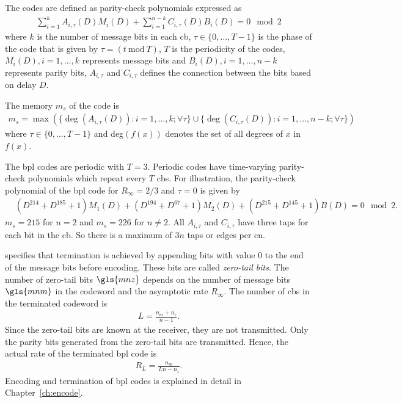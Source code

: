 The codes are defined as parity-check polynomials expressed as
\begin{align}
\sum_{i=1}^{k}A_{i,\tau}(D)M_i(D)+\sum_{i=1}^{n-k}C_{i,\tau}(D)B_i(D)=0\mod 2
\end{align}
where $k$ is the number of message bits in each \gls{cb}, $\tau \in \{0,\dots,T-1\}$ is the phase of the code that is given by $\tau=(t\ \text{mod}\ T)$, $T$ is the periodicity of the codes, $M_i(D),i=1,\dots,k$ represents message bits and $B_i(D),i=1,\dots,n-k$ represents parity bits, $A_{i,\tau}$ and $C_{i,\tau}$ defines the connection between the bits based on delay $D$.

The memory $m_s$ of the code is
\begin{align}
m_s=\max\left(\{\deg(A_{i,\tau}(D)):i=1,\dots,k;\forall\tau\}\cup\{\deg(C_{i,\tau}(D)):i=1,\dots,n-k;\forall\tau\}\right)
\end{align}
where $\tau \in \{0,\dots,T-1\}$ and deg$(f(x))$ denotes the set of all degrees of $x$ in $f(x)$.

The \gls{bpl} codes are periodic with $T=3$. Periodic codes have time-varying parity-check polynomials which repeat every $T$ \glspl{cb}. For illustration, the parity-check polynomial of the \gls{bpl} code for $R_\infty=2/3$ and $\tau=0$ is given by
\begin{align}
&(D^{214}+D^{185}+1)M_1(D)+(D^{194}+D^{67}+1)M_2(D)+(D^{215}+D^{145}+1)B(D)=0\mod 2.
\end{align}
$m_s=215$ for $n=2$ and $m_s=226$ for $n\neq2$. All $A_{i,\tau}$ and $C_{i,\tau}$ have three taps for each bit in the \gls{cb}. So there is a maximum of $3n$ taps or edges per \gls{cn}.

\cite{Bpl} specifies that termination is achieved by appending bits with value $0$ to the end of the message bits before encoding. These bits are called \emph{zero-tail bits}. The number of zero-tail bits $\gls{mnz}$ depends on the number of message bits $\gls{mnm}$ in the codeword and the asymptotic rate $R_\infty$. The number of \glspl{cb} in the terminated codeword is \begin{align}L=\frac{n_m+n_z}{n-1}.\end{align} Since the zero-tail bits are known at the receiver, they are not transmitted. Only the parity bits generated from the zero-tail bits are transmitted. Hence, the actual rate of the terminated \gls{bpl} code is
\begin{align}\label{eq:rate_term}
R_L=\frac{n_m}{Ln-n_z}.
\end{align}
Encoding and termination of \gls{bpl} codes is explained in detail in Chapter~\ref{ch:encode}.


